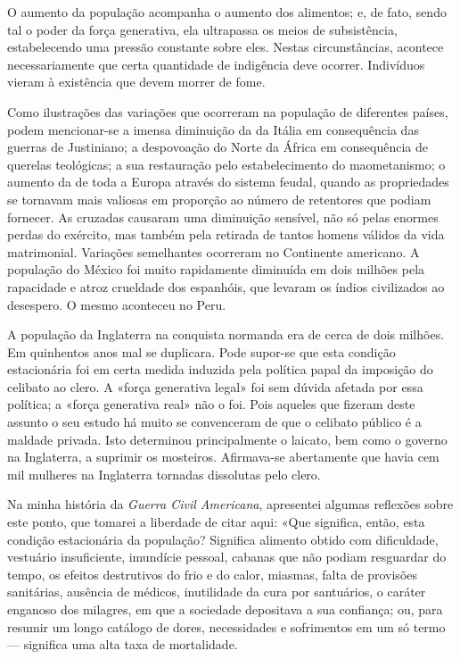 \documentclass[11pt,a5paper,twoside,openany]{book}
\begin{document}
O aumento da população acompanha o aumento dos alimentos; e, de fato, sendo tal o poder da força generativa, ela ultrapassa os meios de subsistência, estabelecendo uma pressão constante sobre eles. Nestas circunstâncias, acontece necessariamente que certa quantidade de indigência deve ocorrer. Indivíduos vieram à existência que devem morrer de fome.

Como ilustrações das variações que ocorreram na população de diferentes países, podem mencionar-se a imensa diminuição da da Itália em consequência das guerras de Justiniano; a despovoação do Norte da África em consequência de querelas teológicas; a sua restauração pelo estabelecimento do maometanismo; o aumento da de toda a Europa através do sistema feudal, quando as propriedades se tornavam mais valiosas em proporção ao número de retentores que podiam fornecer. As cruzadas causaram uma diminuição sensível, não só pelas enormes perdas do exército, mas também pela retirada de tantos homens válidos da vida matrimonial. Variações semelhantes ocorreram no Continente americano. A população do México foi muito rapidamente diminuída em dois milhões pela rapacidade e atroz crueldade dos espanhóis, que levaram os índios civilizados ao desespero. O mesmo aconteceu no Peru.

A população da Inglaterra na conquista normanda era de cerca de dois milhões. Em quinhentos anos mal se duplicara. Pode supor-se que esta condição estacionária foi em certa medida induzida pela política papal da imposição do celibato ao clero. A «força generativa legal» foi sem dúvida afetada por essa política; a «força generativa real» não o foi. Pois aqueles que fizeram deste assunto o seu estudo há muito se convenceram de que o celibato público é a maldade privada. Isto determinou principalmente o laicato, bem como o governo na Inglaterra, a suprimir os mosteiros. Afirmava-se abertamente que havia cem mil mulheres na Inglaterra tornadas dissolutas pelo clero.

Na minha história da \textit{Guerra Civil Americana}, apresentei algumas reflexões sobre este ponto, que tomarei a liberdade de citar aqui: «Que significa, então, esta condição estacionária da população? Significa alimento obtido com dificuldade, vestuário insuficiente, imundície pessoal, cabanas que não podiam resguardar do tempo, os efeitos destrutivos do frio e do calor, miasmas, falta de provisões sanitárias, ausência de médicos, inutilidade da cura por santuários, o caráter enganoso dos milagres, em que a sociedade depositava a sua confiança; ou, para resumir um longo catálogo de dores, necessidades e sofrimentos em um só termo — significa uma alta taxa de mortalidade.
\end{document}
